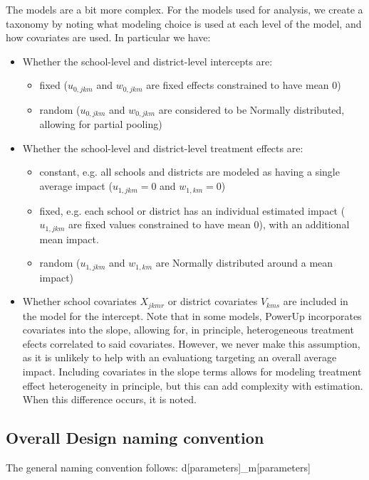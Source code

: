 \documentclass[12pt]{article}
\begin{document}
The models are a bit more complex. For the models used for analysis, we create a taxonomy by noting what modeling choice is used at each level of the model, and how covariates are used.
In particular we have:
\begin{itemize}
\item Whether the school-level and district-level intercepts are:
\begin{itemize}
\item fixed ($u_{0,jkm}$ and $w_{0,jkm}$ are fixed effects constrained to have mean 0)
\item random ($u_{0,jkm}$ and $w_{0,jkm}$ are considered to be Normally distributed, allowing for partial pooling)
\end{itemize}
\item Whether the school-level and district-level treatment effects are:
\begin{itemize}
\item constant, e.g. all schools and districts are modeled as having a single average impact ($u_{1,jkm}= 0$ and $w_{1,km} = 0$)
\item fixed, e.g. each school or district has an individual estimated impact ($u_{1,jkm}$ are fixed values constrained to have mean 0), with an additional mean impact.
\item random ($u_{1,jkm}$ and $w_{1,km}$ are Normally distributed around a mean impact)
\end{itemize}
\item Whether school covariates $X_{jkmr}$ or district covariates $V_{kms}$  are included in the model for the intercept. Note that in some models, PowerUp incorporates covariates into the slope, allowing for, in principle, heterogeneous treatment efects correlated to said covariates. However, we never make this assumption, as it is unlikely to help with an evaluationg targeting an overall average impact. Including covariates in the slope terms allows for modeling treatment effect heterogeneity in principle, but this can add complexity with estimation. When this difference occurs, it is noted.
\end{itemize}



\subsection{Overall Design naming convention}

The general naming convention follows:
d[parameters]\_m[parameters]
\end{document}
